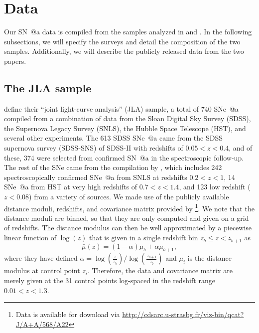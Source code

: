 \documentclass[12pt,a4paper]{article}
\makeatletter
\newcommand*{\rom}[1]{\expandafter\@slowromancap\romannumeral #1@}
\newcommand{\sne}{\mbox{SNe}}
\newcommand{\sna}{\mbox{SN \rom{1}a}}
\newcommand{\snea}{\mbox{SNe \rom{1}a}}
\makeatother
\begin{document}
\section{Data}
\label{sec:data}
Our {\sna} data is compiled from the samples analyzed in 
\citet{betoule2014} and \citet{rest2014}. In the following subsections, 
we will specify the surveys and detail the composition of the two samples. 
Additionally, we will describe the publicly released data from the two papers.

\subsection{The JLA sample}
\label{sec:betoule}
\citet{betoule2014} define their ``joint light-curve analysis'' (JLA) 
sample, a total of 740 \snea{} compiled from a combination of 
data from the Sloan Digital Sky 
Survey (SDSS), the Supernova Legacy Survey (SNLS), the Hubble Space 
Telescope (HST), and several other experiments. The 613 SDSS \snea{} 
came from the SDSS supernova survey (SDSS-SNS) of SDSS-II \citep{sako2014} 
with redshifts of $0.05 < z < 0.4$, and of these, 374 were selected from confirmed \sna{} in the spectroscopic follow-up. The rest of the 
\sne{} came from the compilation by \citet{conley2011}, which includes 
242 spectroscopically confirmed \snea{} from SNLS at redshifts $0.2 < z < 1$, 
14 \snea{} from HST at very high redshifts of $0.7 < z < 1.4$, and 123 
low redshift ($z < 0.08$) from a variety of sources. We made use of the 
publicly available distance moduli, redshifts, and covariance 
matrix provided by \citet{betoule2014}\footnote{Data is available 
for download via 
\url{http://cdsarc.u-strasbg.fr/viz-bin/qcat?J/A+A/568/A22}}. 
We note that the distance moduli are binned, so that they are only computed and 
given on a grid of redshifts. The distance modulus can then be well 
approximated by a piecewise linear function of $\log(z)$ that is given 
in a single redshift bin $z_b \le z < z_{b+1}$ as 
\citep[see][Appendix E.1]{betoule2014}
%
\begin{equation}
\label{eq:binnedMu}
\bar{\mu}(z) = (1 - \alpha) \mu_b + \alpha \mu_{b+1},
\end{equation}
%
where they have defined 
$\alpha = \log\left(\frac{z}{z_b}\right)/\log\left(\frac{z_{b+1}}{z_b}\right)$ 
and $\mu_i$ is the distance modulus at control point $z_i$. 
Therefore, the data and covariance matrix are merely given at the 
31 control points log-spaced in the redshift range $0.01 < z < 1.3$.
\end{document}
